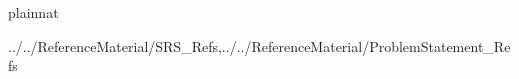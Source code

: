 \documentclass[12pt]{article}
\begin{document}
\newpage

 {plainnat}
 
{../../ReferenceMaterial/SRS_Refs,../../ReferenceMaterial/ProblemStatement_Refs}

%
%
%
%
\end{document}
